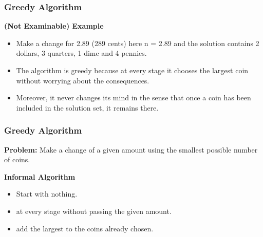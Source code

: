 \documentclass{beamer}
\begin{document}
\begin{frame}
	\frametitle{Greedy Algorithm} 
	
\textbf{ (Not Examinable) Example }  
	\begin{itemize}
	\item  Make a change for 2.89 (289 cents) here n = 2.89 and the solution contains 2 dollars, 3 quarters, 1 dime and 4 pennies. 
	\item The algorithm is greedy because at every stage it chooses the largest coin without worrying about the consequences.
	\item  Moreover, it never changes its mind in the sense that once a coin has been included in the solution set, it remains there.
	\end{itemize}
	
	
\end{frame}
\begin{frame}
	\frametitle{Greedy Algorithm}
\noindent \textbf{Problem:}  Make a change of a given amount using the smallest possible number of coins. \\ \medskip
	
\noindent \textbf{Informal Algorithm}
	\begin{itemize}
		\item Start with nothing.
		\item at every stage without passing the given amount.
		\item add the largest to the coins already chosen.
	\end{itemize}
	

	
	
\end{frame}
%	
%	
%	
%	
%	
\end{document}
